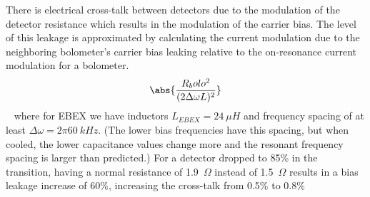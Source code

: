 %
%





There is electrical cross-talk between detectors due to the modulation of the detector resistance which results in the modulation of the carrier bias. 
The level of this leakage is approximated by calculating the current modulation due to the neighboring bolometer's carrier bias leaking relative to the on-resonance current modulation for a bolometer. 
\begin{equation}
\abs{\frac{R_bolo^2}{(2\Delta \omega L)^2}}
\end{equation}
~\citep{Dobbs2011}
where for \ac{EBEX} we have inductors $L_{EBEX} = 24~\mu H$ and frequency spacing of at least $\Delta \omega = 2\pi 60~kHz$. 
(The lower bias frequencies have this spacing, but when cooled, the lower capacitance values change more and the resonant frequency spacing is larger than predicted.)
For a detector dropped to 85\% in the transition, having a normal resistance of 1.9~$\Omega$ instead of 1.5~$\Omega$ results in a bias leakage increase of 60\%, increasing the cross-talk from 0.5\% to 0.8\%


